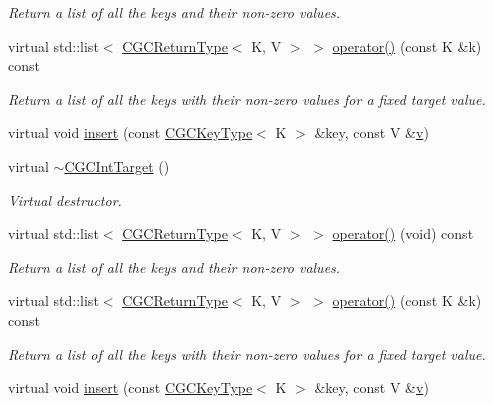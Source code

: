 \begin{DoxyCompactItemize}
\begin{DoxyCompactList}\small\item\em Return a list of all the keys and their non-\/zero values. \end{DoxyCompactList}\item 
virtual std\+::list$<$ \mbox{\hyperlink{structHadron_1_1CGCReturnType}{C\+G\+C\+Return\+Type}}$<$ K, V $>$ $>$ \mbox{\hyperlink{classHadron_1_1CGCIntTarget_a5946627ddb796961b97b7e0c57e32d83}{operator()}} (const K \&k) const
\begin{DoxyCompactList}\small\item\em Return a list of all the keys with their non-\/zero values for a fixed target value. \end{DoxyCompactList}\item 
virtual void \mbox{\hyperlink{classHadron_1_1CGCIntTarget_a2c1e2eaf068abdc394ba3326c7770e77}{insert}} (const \mbox{\hyperlink{structHadron_1_1CGCKeyType}{C\+G\+C\+Key\+Type}}$<$ K $>$ \&key, const V \&\mbox{\hyperlink{adat__devel_2lib_2hadron_2hadron__timeslice_8cc_a716fc87f5e814be3ceee2405ed6ff22a}{v}})
\item 
virtual \mbox{\hyperlink{classHadron_1_1CGCIntTarget_a6b808ca161d3dae62109495144178541}{$\sim$\+C\+G\+C\+Int\+Target}} ()
\begin{DoxyCompactList}\small\item\em Virtual destructor. \end{DoxyCompactList}\item 
virtual std\+::list$<$ \mbox{\hyperlink{structHadron_1_1CGCReturnType}{C\+G\+C\+Return\+Type}}$<$ K, V $>$ $>$ \mbox{\hyperlink{classHadron_1_1CGCIntTarget_ae6c0ce90fe1f8a2880984df1e2e44c18}{operator()}} (void) const
\begin{DoxyCompactList}\small\item\em Return a list of all the keys and their non-\/zero values. \end{DoxyCompactList}\item 
virtual std\+::list$<$ \mbox{\hyperlink{structHadron_1_1CGCReturnType}{C\+G\+C\+Return\+Type}}$<$ K, V $>$ $>$ \mbox{\hyperlink{classHadron_1_1CGCIntTarget_a5946627ddb796961b97b7e0c57e32d83}{operator()}} (const K \&k) const
\begin{DoxyCompactList}\small\item\em Return a list of all the keys with their non-\/zero values for a fixed target value. \end{DoxyCompactList}\item 
virtual void \mbox{\hyperlink{classHadron_1_1CGCIntTarget_a2c1e2eaf068abdc394ba3326c7770e77}{insert}} (const \mbox{\hyperlink{structHadron_1_1CGCKeyType}{C\+G\+C\+Key\+Type}}$<$ K $>$ \&key, const V \&\mbox{\hyperlink{adat__devel_2lib_2hadron_2hadron__timeslice_8cc_a716fc87f5e814be3ceee2405ed6ff22a}{v}})
\end{DoxyCompactItemize}


